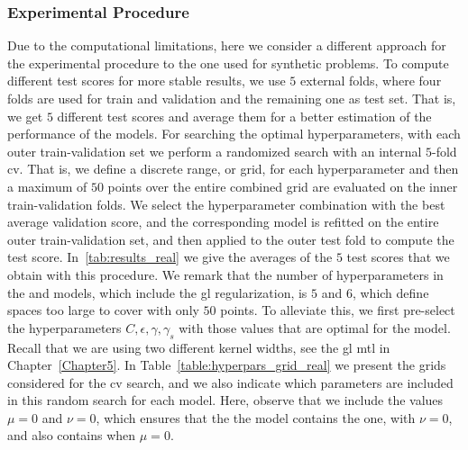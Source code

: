 \subsubsection*{Experimental Procedure}
Due to the computational limitations, here we consider a different approach for the experimental procedure to the one used for synthetic problems.
To compute different test scores for more stable results, we use $5$ external folds, where four folds are used for train and validation and the remaining one as test set.
That is, we get $5$ different test scores and average them for a better estimation of the performance of the models. 
%
For searching the optimal hyperparameters, with each outer train-validation set we perform a randomized search with an internal $5$-fold \acrshort{cv}. That is, we define a discrete range, or grid, for each hyperparameter and then a maximum of $50$ points over the entire combined grid are evaluated on the inner train-validation folds.
%
We select the hyperparameter combination with the best average validation score, and the corresponding model is refitted on the entire outer train-validation set, and then applied to the outer test fold to compute the test score. In~\ref{tab:results_real} we give the averages of the $5$ test scores that we obtain with this procedure.
%
We remark that the number of hyperparameters in the  and  models, which include the \acrshort{gl} regularization, is $5$ and $6$, which define spaces too large to cover with only $50$ points. To alleviate this, we first pre-select the hyperparameters $C, \epsilon, \gamma, \gamma_s$ with those values that are optimal for the  model. Recall that we are using two different kernel widths, see the \acrshort{gl} \acrshort{mtl} in Chapter~\ref{Chapter5}.
%
In Table~\ref{table:hyperpars_grid_real} we present the grids considered for the \acrshort{cv} search, and we also indicate which parameters are included in this random search for each model.
Here, observe that we include the values $\mu=0$ and $\nu=0$, which ensures that the the  model contains the  one, with $\nu=0$, and also  contains  when $\mu=0$.
%

